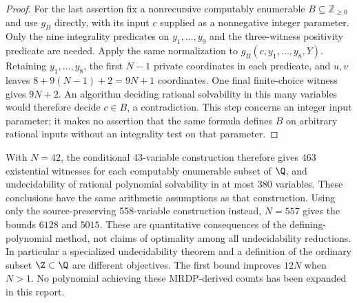 \begin{proof}
For the last assertion fix a nonrecursive computably enumerable
$B\subseteq\mathbb Z_{\ge0}$ and use $g_B$ directly, with its
input $c$ supplied as a nonnegative integer parameter. Only the nine
integrality predicates on $y_1,\ldots,y_9$ and the three-witness
positivity predicate are needed. Apply the same normalization to
$g_B(c,y_1,\ldots,y_8,Y)$. Retaining $y_1,\ldots,y_8$, the first
$N-1$ private coordinates in each predicate, and $u,v$ leaves
$8+9(N-1)+2=9N+1$ coordinates. One final finite-choice witness
gives $9N+2$. An algorithm deciding rational solvability in this
many variables would
therefore decide $c\in B$, a contradiction. This step concerns an
integer input parameter; it makes no assertion that the same formula
defines $B$ on arbitrary rational inputs without an integrality test
on that parameter.
\end{proof}

With $N=42$, the conditional 43-variable construction therefore gives
$463$ existential witnesses for each computably enumerable subset of
$\Q$, and undecidability of rational polynomial solvability in at most
$380$ variables. These conclusions have the same arithmetic assumptions
as that construction. Using only the source-preserving 558-variable
construction instead, $N=557$ gives the bounds $6128$ and $5015$.
These are quantitative consequences of the defining-polynomial method,
not claims of optimality among all undecidability reductions. In
particular a specialized undecidability theorem and a definition of the
ordinary subset $\Z\subset\Q$ are different objectives. The first
bound improves $12N$ when $N>1$. No polynomial achieving these
MRDP-derived counts has been expanded in this report.

